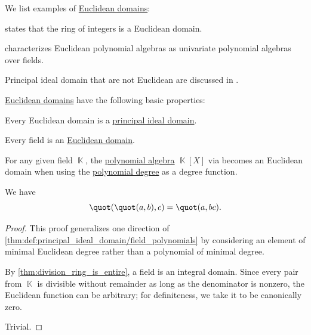 \begin{example}\label{ex:def:euclidean_domain}
  We list examples of \hyperref[def:euclidean_domain]{Euclidean domains}:
  \begin{thmenum}
      states that the ring of integers is a Euclidean domain.

      characterizes Euclidean polynomial algebras as univariate polynomial algebras over fields.

     Principal ideal domain that are not Euclidean are discussed in \cite{Anderson1988NonEuclideanPID}.
  \end{thmenum}
\end{example}

\begin{proposition}\label{thm:def:euclidean_domain}
  \hyperref[def:euclidean_domain]{Euclidean domains} have the following basic properties:
  \begin{thmenum}
     Every Euclidean domain is a \hyperref[def:principal_ideal_domain]{principal ideal domain}.

     Every field is an \hyperref[def:euclidean_domain]{Euclidean domain}.

     For any given field \( \BbbK \), the \hyperref[def:polynomial_algebra]{polynomial algebra} \( \BbbK[X] \) via  becomes an Euclidean domain when using the \hyperref[def:polynomial_degree]{polynomial degree} as a degree function.

     We have
    \begin{equation}\label{eq:thm:def:euclidean_domain/nested_quot}
      \quot(\quot(a, b), c) = \quot(a, bc).
    \end{equation}
  \end{thmenum}
\end{proposition}
\begin{proof}
   This proof generalizes one direction of \cref{thm:def:principal_ideal_domain/field_polynomials} by considering an element of minimal Euclidean degree rather than a polynomial of minimal degree.

   By \cref{thm:division_ring_is_entire}, a field is an integral domain. Since every pair from \( \BbbK \) is divisible without remainder as long as the denominator is nonzero, the Euclidean function can be arbitrary; for definiteness, we take it to be canonically zero.

   Trivial.
\end{proof}

